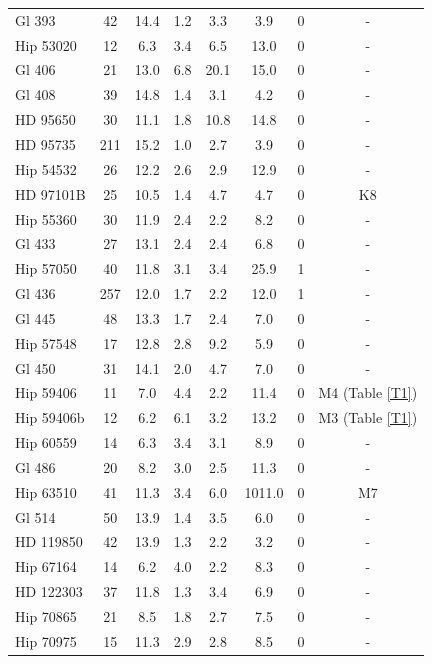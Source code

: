 \begin{landscape}
{\begin{longtable}{l|ccccccc}
Gl 393  &  42 &  14.4 &   1.2 &   3.3 &   3.9 & 0 & -  \\ 
Hip 53020  &  12 &   6.3 &   3.4 &   6.5 &  13.0 & 0 & -  \\ 
Gl 406  &  21 &  13.0 &   6.8 & 20.1 &  15.0 & 0 & -  \\ 
Gl 408  &  39 &  14.8 &   1.4 &   3.1 &   4.2 & 0 & -  \\ 
HD 95650  &  30 &  11.1 &   1.8 &  10.8 &  14.8 & 0 & -  \\ 
HD 95735  & 211 &  15.2 &   1.0 &   2.7 &   3.9 & 0 & -  \\ 
Hip 54532  &  26 &  12.2 &   2.6 &   2.9 &  12.9 & 0 & -  \\ 
HD 97101B &  25 &  10.5 &   1.4 &   4.7 &   4.7 & 0 & K8 \citep{Gliese91}  \\ 
Hip 55360  &  30 &  11.9 &   2.4 &   2.2 &   8.2 & 0 & -  \\ 
Gl 433  &  27 &  13.1 &   2.4 &   2.4 &   6.8 & 0 & -  \\ 
Hip 57050 &  40 &  11.8 &   3.1 &   3.4 &  25.9 & 1 & -  \\ 
Gl 436 & 257 &  12.0 &   1.7 &   2.2 &  12.0 & 1 & -  \\ 
Gl 445  &  48 &  13.3 &   1.7 &   2.4 &   7.0 & 0 & -  \\ 
Hip 57548  &  17 &  12.8 &   2.8 &   9.2 &   5.9 & 0 & -  \\ 
Gl 450  &  31 &  14.1 &   2.0 &   4.7 &   7.0 & 0 & -  \\ 
Hip 59406 &  11 &   7.0 &   4.4 &   2.2 &  11.4 & 0 & M4 (Table \ref{T1}) \\ 
Hip 59406b &  12 &   6.2 &   6.1 &   3.2 &  13.2 & 0 & M3 (Table \ref{T1}) \\ 
Hip 60559  &  14 &   6.3 &   3.4 &   3.1 &   8.9 & 0 & -  \\ 
Gl 486  &  20 &   8.2 &   3.0 &   2.5 &  11.3 & 0 & -  \\ 
Hip 63510  &  41 &  11.3 &   3.4 &   6.0 & 1011.0 & 0 & M7 \citep{Beuzit04}  \\ 
Gl 514  &  50 &  13.9 &   1.4 &   3.5 &   6.0 & 0 & -  \\ 
HD 119850  &  42 &  13.9 &   1.3 &   2.2 &   3.2 & 0 & -  \\ 
Hip 67164  &  14 &   6.2 &   4.0 &   2.2 &   8.3 & 0 & -  \\ 
HD 122303  &  37 &  11.8 &   1.3 &   3.4 &   6.9 & 0 & -  \\ 
Hip 70865 &  21 &   8.5 &   1.8 &   2.7 &   7.5 & 0 & -  \\ 
Hip 70975  &  15 &  11.3 &   2.9 &   2.8 &   8.5 & 0 & -  \\ 

\end{longtable}}
\end{landscape}

